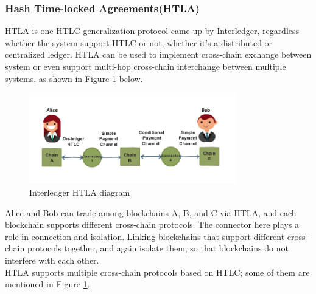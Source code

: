 \subsubsection{Hash Time-locked Agreements(HTLA)}
\noindent HTLA is one HTLC generalization protocol came up by Interledger\cite{HTLA}, regardless whether the system support HTLC or not, whether it's a distributed or centralized ledger. HTLA can be used to implement cross-chain exchange between system or even support multi-hop cross-chain interchange between multiple systems, as shown in Figure \ref{fig:HTLA} below.
   \begin{figure}[H]
    \includegraphics[width=0.8\textwidth]{./figures/HTLA.png}
    \centering
    \caption{Interledger HTLA diagram}%
    \centering
    \label{fig:HTLA}
    \end{figure}
    
\noindent Alice and Bob can trade among blockchains A, B, and C via HTLA, and each blockchain supports different cross-chain protocols. The connector here plays a role in connection and isolation. Linking blockchains that support different cross-chain protocols together, and again isolate them, so that blockchains do not interfere with each other.\\
\noindent HTLA supports multiple cross-chain protocols based on HTLC; some of them are mentioned in Figure \ref{fig:HTLA}.


